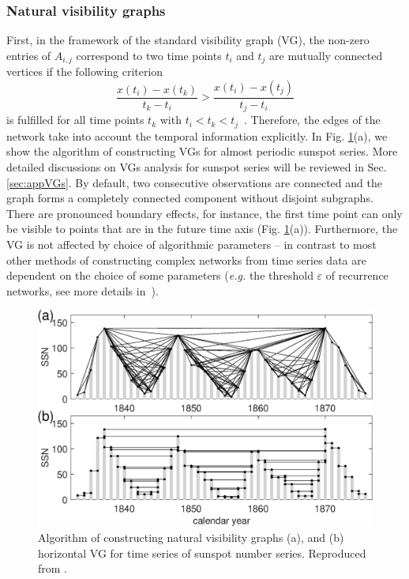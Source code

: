 		\subsubsection{Natural visibility graphs}
		First, in the framework of the standard visibility graph (VG), the non-zero entries of $A_{i,j}$ correspond to two time points $t_i$ and $t_j$ are mutually connected vertices if the following criterion 
\begin{equation} \label{vis_cond}
	\frac{x(t_i)-x(t_k)}{t_k - t_i} > \frac{x(t_i) - x(t_j)}{t_j - t_i}
\end{equation}
is fulfilled for all time points $t_k$ with $t_i < t_k < t_j$~\cite{Lacasa2008}. Therefore, the edges of the network take into account the temporal information explicitly.  In Fig. \ref{fig_chap04:timeseriesSS}(a), we show the algorithm of constructing VGs for almost periodic sunspot series. More detailed discussions on VGs analysis for sunspot series will be reviewed in Sec. \ref{sec:appVGs}. By default, two consecutive observations are connected and the graph forms a completely connected component without disjoint subgraphs. There are pronounced boundary effects, for instance, the first time point can only be visible to points that are in the future time axis (Fig. \ref{fig_chap04:timeseriesSS}(a)). Furthermore, the VG is not affected by choice of algorithmic parameters -- in contrast to most other methods of constructing complex networks from time series data are dependent on the choice of some parameters ({\emph{e.g.}} the threshold $\varepsilon$ of recurrence networks, see more details in~\cite{Donner2010a}). 
		\begin{figure}
		  \centering
		  \includegraphics[width=0.8\columnwidth]{Chapter04_VisibilityGt/TSspotnumberYear.eps}
		  \caption{Algorithm of constructing natural visibility graphs (a), and (b) horizontal VG for time series of sunspot number series. Reproduced from \cite{Zou2014}. \label{fig_chap04:timeseriesSS}}
		\end{figure}
		
